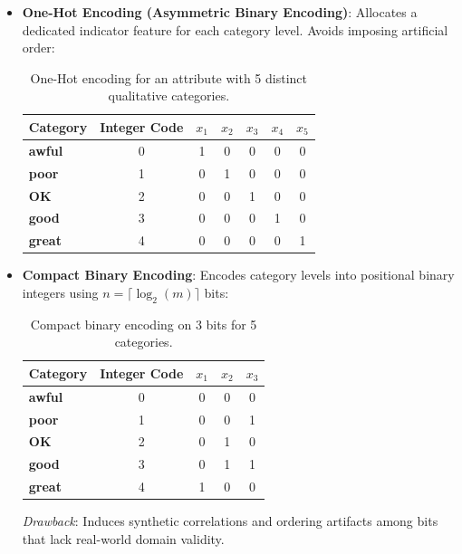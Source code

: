 \begin{itemize}
    \item \textbf{One-Hot Encoding (Asymmetric Binary Encoding)}: Allocates a dedicated indicator feature for each category level. Avoids imposing artificial order:
    \begin{table}[htbp]
        \centering
        \small
        \begin{tabular}{lcccccc}
            \toprule
            \textbf{Category} & \textbf{Integer Code} & $x_1$ & $x_2$ & $x_3$ & $x_4$ & $x_5$ \\
            \midrule
            \textbf{awful} & 0 & 1 & 0 & 0 & 0 & 0 \\
            \textbf{poor}  & 1 & 0 & 1 & 0 & 0 & 0 \\
            \textbf{OK}    & 2 & 0 & 0 & 1 & 0 & 0 \\
            \textbf{good}  & 3 & 0 & 0 & 0 & 1 & 0 \\
            \textbf{great} & 4 & 0 & 0 & 0 & 0 & 1 \\
            \bottomrule
        \end{tabular}
        \caption{One-Hot encoding for an attribute with 5 distinct qualitative categories.}
        \label{tab:dm-one-hot}
    \end{table}

    \item \textbf{Compact Binary Encoding}: Encodes category levels into positional binary integers using $n = \lceil \log_2(m) \rceil$ bits:
    \begin{table}[htbp]
        \centering
        \small
        \begin{tabular}{lcccc}
            \toprule
            \textbf{Category} & \textbf{Integer Code} & $x_1$ & $x_2$ & $x_3$ \\
            \midrule
            \textbf{awful} & 0 & 0 & 0 & 0 \\
            \textbf{poor}  & 1 & 0 & 0 & 1 \\
            \textbf{OK}    & 2 & 0 & 1 & 0 \\
            \textbf{good}  & 3 & 0 & 1 & 1 \\
            \textbf{great} & 4 & 1 & 0 & 0 \\
            \bottomrule
        \end{tabular}
        \caption{Compact binary encoding on 3 bits for 5 categories.}
        \label{tab:dm-compact-binary}
    \end{table}
    \textit{Drawback}: Induces synthetic correlations and ordering artifacts among bits that lack real-world domain validity.
\end{itemize}

